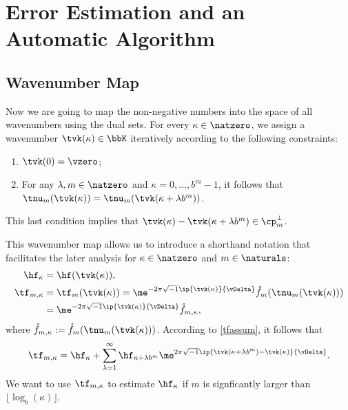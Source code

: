 \documentclass[]{elsarticle}
\theoremstyle{definition}
\newcommand{\rf}{\mathring{f}}
\begin{document}
\section{Error Estimation and an Automatic Algorithm}

\subsection{Wavenumber Map}

Now we are going to map the non-negative numbers into the space of all wavenumbers using the dual sets.  For every $\kappa \in \natzero$, we assign a wavenumber $\tvk(\kappa) \in \bbK$ iteratively according to the following constraints:
\begin{enumerate}
\renewcommand{\labelenumi}{\roman{enumi})}

\item $\tvk(0)= \vzero$;

\item For any $\lambda, m \in \natzero$ and $\kappa=0, \ldots, b^m-1$, it follows that  $\tnu_m(\tvk(\kappa))=\tnu_m(\tvk(\kappa+\lambda b^m))$.

\end{enumerate}
This last condition implies that $\tvk(\kappa) - \tvk(\kappa+\lambda b^m) \in \cp_m^{\perp}$.

This wavenumber map allows us to introduce a shorthand notation that facilitates the later analysis for $\kappa \in \natzero$ and $m \in \naturals$:
\begin{align*}
\hf_{\kappa} & =\hf(\tvk(\kappa)), \\
\tf_{m,\kappa}& = \tf_m(\tvk(\kappa))= \me^{-2 \pi \sqrt{-1} \ip{\tvk(\kappa)}{\vDelta}} \rf_m(\tnu_m(\tvk(\kappa)))\\
&= \me^{-2 \pi \sqrt{-1} \ip{\tvk(\kappa)}{\vDelta}} \rf_{m,\kappa},
\end{align*}
where $\rf_{m,\kappa}:=\rf_m(\tnu_m(\tvk(\kappa)))$. According to \eqref{tfassum}, it follows that
\begin{equation}
\tf_{m,\kappa} = \hf_{\kappa} + \sum_{\lambda=1}^{\infty} \hf_{\kappa+\lambda b^{m}} \me^{2 \pi \sqrt{-1} \ip{\tvk(\kappa+\lambda b^{m}) - \tvk(\kappa)}{\vDelta}}.
\label{tfassumc}
\end{equation}
We want to use $\tf_{m,\kappa}$ to estimate $\hf_{\kappa}$ if $m$ is signficantly larger than $\lfloor \log_b(\kappa) \rfloor$.
\end{document}
